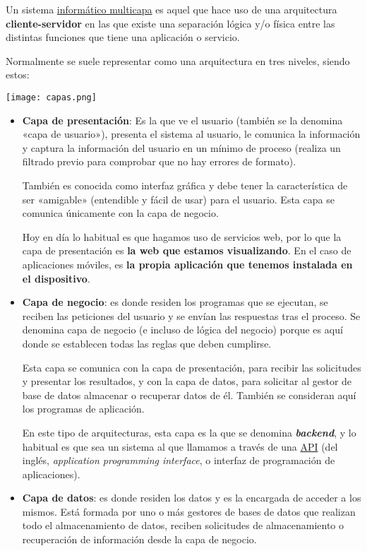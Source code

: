 Un sistema \href{https://es.wikipedia.org/wiki/Arquitectura_multicapa}{informático multicapa} es aquel que hace uso de una arquitectura \textbf{cliente-servidor} en las que existe una separación lógica y/o física entre las distintas funciones que tiene una aplicación o servicio.

Normalmente se suele representar como una arquitectura en tres niveles, siendo estos:

\begin{center}
    \texttt{[image: capas.png]}
\end{center}

\begin{itemize}
    \item \textbf{Capa de presentación}: Es la que ve el usuario (también se la denomina «capa de usuario»), presenta el sistema al usuario, le comunica la información y captura la información del usuario en un mínimo de proceso (realiza un filtrado previo para comprobar que no hay errores de formato).

    También es conocida como interfaz gráfica y debe tener la característica de ser «amigable» (entendible y fácil de usar) para el usuario. Esta capa se comunica únicamente con la capa de negocio.

    Hoy en día lo habitual es que hagamos uso de servicios web, por lo que la capa de presentación es \textbf{la web que estamos visualizando}. En el caso de aplicaciones móviles, es \textbf{la propia aplicación que tenemos instalada en el dispositivo}.

    \item \textbf{Capa de negocio}: es donde residen los programas que se ejecutan, se reciben las peticiones del usuario y se envían las respuestas tras el proceso. Se denomina capa de negocio (e incluso de lógica del negocio) porque es aquí donde se establecen todas las reglas que deben cumplirse.

    Esta capa se comunica con la capa de presentación, para recibir las solicitudes y presentar los resultados, y con la capa de datos, para solicitar al gestor de base de datos almacenar o recuperar datos de él. También se consideran aquí los programas de aplicación.

    En este tipo de arquitecturas, esta capa es la que se denomina \textbf{\textit{backend}}, y lo habitual es que sea un sistema al que llamamos a través de una \href{https://es.wikipedia.org/wiki/API}{API} (del inglés, \textit{application programming interface}, o interfaz de programación de aplicaciones).

    \item \textbf{Capa de datos}: es donde residen los datos y es la encargada de acceder a los mismos. Está formada por uno o más gestores de bases de datos que realizan todo el almacenamiento de datos, reciben solicitudes de almacenamiento o recuperación de información desde la capa de negocio.
\end{itemize}

